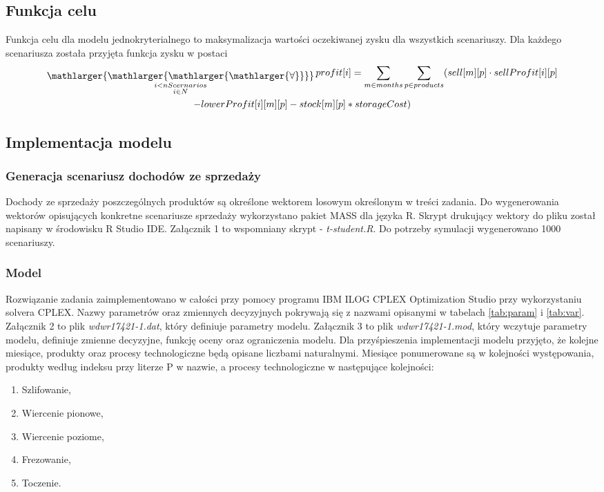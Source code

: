 \documentclass[11pt,a4paper]{article}
\newcommand\bigforall{%
  \mathop{\lower0.75ex\hbox{\ensuremath{%
    \mathlarger{\mathlarger{\mathlarger{\mathlarger{\forall}}}}}}}%
  \limits}
\begin{document}
\subsection{Funkcja celu}
Funkcja celu dla modelu jednokryterialnego to maksymalizacja wartości oczekiwanej zysku dla wszystkich scenariuszy. Dla każdego scenariusza została przyjęta funkcja zysku w postaci
\begin{multline}
\bigforall_{\substack{
			i<nScernarios\\ 
			i \in N}}  
	profit[i] =\sum_{m \in months} \sum_{p \in products}
		(sell[m][p]\cdot sellProfit[i][p] \\ -lowerProfit[i][m][p]-stock[m][p]*storageCost)
\end{multline}
 


\subsection{Implementacja modelu}
\subsubsection{Generacja scenariusz dochodów ze sprzedaży}
Dochody ze sprzedaży poszczególnych produktów są określone wektorem losowym określonym w treści zadania. Do wygenerowania wektorów opisujących konkretne scenariusze sprzedaży wykorzystano pakiet MASS dla języka R. Skrypt drukujący wektory do pliku został napisany w środowisku R Studio IDE. Załącznik 1 to wspomniany skrypt - \textit{t-student.R}. Do potrzeby symulacji wygenerowano 1000 scenariuszy.

\subsubsection{Model}
Rozwiązanie zadania zaimplementowano w całości przy pomocy programu IBM ILOG CPLEX Optimization Studio przy wykorzystaniu solvera CPLEX. Nazwy parametrów oraz zmiennych decyzyjnych pokrywają się z nazwami opisanymi w tabelach \ref{tab:param} i \ref{tab:var}. Załącznik 2 to plik \textit{wdwr17421-1.dat}, który definiuje parametry modelu. Załącznik 3 to plik \textit{wdwr17421-1.mod}, który wczytuje parametry modelu, definiuje zmienne decyzyjne, funkcję oceny oraz ograniczenia modelu. Dla przyśpieszenia implementacji modelu przyjęto, że kolejne miesiące, produkty oraz procesy technologiczne będą opisane liczbami naturalnymi.  Miesiące ponumerowane są w kolejności występowania, produkty według indeksu przy literze P w nazwie, a procesy technologiczne w następujące kolejności:
\begin{enumerate}
\item Szlifowanie,
\item Wiercenie pionowe,
\item Wiercenie poziome,
\item Frezowanie,
\item Toczenie.
\end{enumerate}
\end{document}
